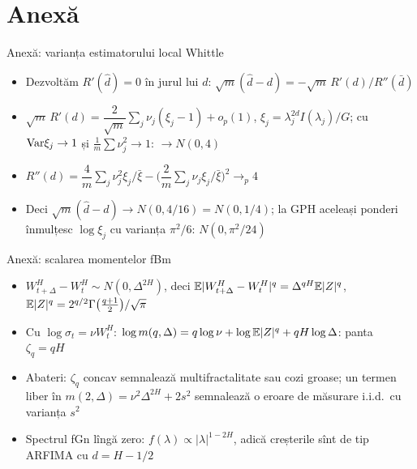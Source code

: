 \section{Anexă}

\begin{frame}{Anexă: varianța estimatorului local Whittle}
\hypertarget{atsapp1}{}
\itemsize{\small}
\begin{itemize}
    \item Dezvoltăm $R'(\hat d) = 0$ în jurul lui $d$: $\sqrt m(\hat d - d) = -\sqrt m\,R'(d)/R''(\bar d)$
    \item $\sqrt m\,R'(d) = \dfrac{2}{\sqrt m}\sum_j\nu_j(\xi_j - 1) + o_p(1)$, $\xi_j = \lambda_j^{2d}I(\lambda_j)/G$; cu $\text{Var}\xi_j \to 1$ și $\frac1m\sum\nu_j^2 \to 1$: $\to N(0, 4)$
    \item $R''(d) = \dfrac4m\sum_j\nu_j^2\xi_j/\bar\xi - \big(\dfrac2m\sum_j\nu_j\xi_j/\bar\xi\big)^2 \to_p 4$
    \item Deci $\sqrt m(\hat d - d) \to N(0, 4/16) = N(0, 1/4)$; la GPH aceleași ponderi înmulțesc $\log\xi_j$ cu varianța $\pi^2/6$: $N(0, \pi^2/24)$
\end{itemize}
\end{frame}

\begin{frame}{Anexă: scalarea momentelor fBm}
\hypertarget{atsapp2}{}
\itemsize{\small}
\begin{itemize}
    \item $W^H_{t+\Delta} - W^H_t \sim N(0, \Delta^{2H})$, deci $\mathbb{E}|W^H_{t+\Delta} - W^H_t|^q = \Delta^{qH}\mathbb{E}|Z|^q$, $\mathbb{E}|Z|^q = 2^{q/2}\Gamma\big(\tfrac{q+1}{2}\big)/\sqrt\pi$
    \item Cu $\log\sigma_t = \nu W^H_t$: $\log m(q, \Delta) = q\log\nu + \log\mathbb{E}|Z|^q + qH\log\Delta$: panta $\zeta_q = qH$
    \item Abateri: $\zeta_q$ concav semnalează multifractalitate sau cozi groase; un termen liber în $m(2, \Delta) = \nu^2\Delta^{2H} + 2s^2$ semnalează o eroare de măsurare i.i.d.\ cu varianța $s^2$
    \item Spectrul fGn lîngă zero: $f(\lambda) \propto |\lambda|^{1-2H}$, adică creșterile sînt de tip ARFIMA cu $d = H - 1/2$
\end{itemize}
\end{frame}



